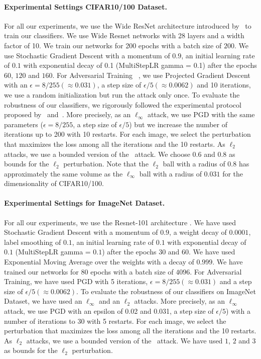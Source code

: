 \paragraph{Experimental Settings CIFAR10/100 Dataset.}
For all our experiments, we use the Wide ResNet architecture introduced by~\citet{zagoruyko2016wide} to train our classifiers.
We use Wide Resnet networks with 28 layers and a width factor of 10.
We train our networks for 200 epochs with a batch size of $200$.
We use Stochastic Gradient Descent with a momentum of $0.9$, an initial learning rate of $0.1$ with exponential decay of 0.1 (MultiStepLR gamma = 0.1) after the epochs $60$, $120$ and $160$.
For Adversarial Training ~\cite{madry2018towards}, we use Projected Gradient Descent with an $\epsilon = 8/255 (\approx 0.031)$, a step size of $\epsilon/5 (\approx 0.0062)$ and 10 iterations, we use a random initialization but run the attack only once.
To evaluate the robustness of our classifiers, we rigorously followed the experimental protocol proposed by~\citet{tramer2020adaptive} and~\citet{carlini2019evaluating}.
More precisely, as an $\ell_\infty$ attack, we use PGD with the same parameters ($\epsilon = 8/255$, a step size of $\epsilon/5$) but we increase the number of iterations up to 200 with 10 restarts.
For each image, we select the perturbation that maximizes the loss among all the iterations and the 10 restarts.
As $\ell_2$ attacks, we use a bounded version of the~\citet{carlini2017towards} attack.
We choose $0.6$ and $0.8$ as bounds for the $\ell_2$ perturbation.
Note that the $\ell_2$ ball with a radius of $0.8$ has approximately the same volume as the $\ell_\infty$ ball with a radius of $0.031$ for the dimensionality of CIFAR10/100.


\paragraph{Experimental Settings for ImageNet Dataset.}
For all our experiments, we use the Resnet-101 architecture \cite{he2016deep}.
We have used Stochastic Gradient Descent with a momentum of $0.9$, a weight decay of $0.0001$, label smoothing of $0.1$, an initial learning rate of $0.1$ with exponential decay of $0.1$ (MultiStepLR gamma = $0.1$) after the epochs $30$ and $60$.
We have used Exponential Moving Average over the weights with a decay of $0.999$.
We have trained our networks for 80 epochs with a batch size of $4096$.
For Adversarial Training, we have used PGD with 5 iterations, $\epsilon = 8/255 (\approx 0.031)$ and a step size of $\epsilon/5 (\approx 0.0062)$.
To evaluate the robustness of our classifiers on ImageNet Dataset, we have used an $\ell_\infty$ and an $\ell_2$ attacks.
More precisely, as an $\ell_\infty$ attack, we use PGD with an epsilon of 0.02 and 0.031, a step size of $\epsilon/5$) with a number of iterations to 30 with 5 restarts.
For each image, we select the perturbation that maximizes the loss among all the iterations and the 10 restarts.
As $\ell_2$ attacks, we use a bounded version of the~\citet{carlini2017towards} attack.
We have used $1$, $2$ and $3$ as bounds for the $\ell_2$ perturbation.


